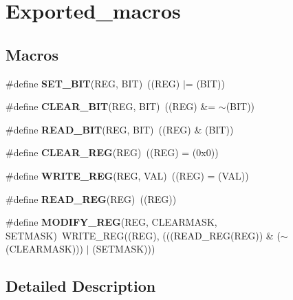 \hypertarget{group___exported__macros}{}\section{Exported\+\_\+macros}
\label{group___exported__macros}
\subsection*{Macros}
\begin{DoxyCompactItemize}
\item 
\mbox{\label{group___exported__macros_ga26474f43799fbade9cf300e21dd3a91a}} 
\#define {\bfseries S\+E\+T\+\_\+\+B\+IT}(R\+EG,  B\+IT)~((R\+EG) $\vert$= (B\+IT))
\item 
\mbox{\label{group___exported__macros_ga133aae6fc0d41bffab39ab223a7001de}} 
\#define {\bfseries C\+L\+E\+A\+R\+\_\+\+B\+IT}(R\+EG,  B\+IT)~((R\+EG) \&= $\sim$(B\+IT))
\item 
\mbox{\label{group___exported__macros_ga822bb1bb9710d5f2fa6396b84e583c33}} 
\#define {\bfseries R\+E\+A\+D\+\_\+\+B\+IT}(R\+EG,  B\+IT)~((R\+EG) \& (B\+IT))
\item 
\mbox{\label{group___exported__macros_ga1378fbdda39f40b85420df55f41460ef}} 
\#define {\bfseries C\+L\+E\+A\+R\+\_\+\+R\+EG}(R\+EG)~((R\+EG) = (0x0))
\item 
\mbox{\label{group___exported__macros_ga32f78bffcaf6d13023dcd7f05e0c4d57}} 
\#define {\bfseries W\+R\+I\+T\+E\+\_\+\+R\+EG}(R\+EG,  V\+AL)~((R\+EG) = (V\+AL))
\item 
\mbox{\label{group___exported__macros_gae7f188a4d26c9e713a48414783421071}} 
\#define {\bfseries R\+E\+A\+D\+\_\+\+R\+EG}(R\+EG)~((R\+EG))
\item 
\mbox{\label{group___exported__macros_ga6553c99f510c3bab8cc0a91602053247}} 
\#define {\bfseries M\+O\+D\+I\+F\+Y\+\_\+\+R\+EG}(R\+EG,  C\+L\+E\+A\+R\+M\+A\+SK,  S\+E\+T\+M\+A\+SK)~W\+R\+I\+T\+E\+\_\+\+R\+EG((R\+EG), (((R\+E\+A\+D\+\_\+\+R\+EG(R\+EG)) \& ($\sim$(C\+L\+E\+A\+R\+M\+A\+SK))) $\vert$ (S\+E\+T\+M\+A\+SK)))
\end{DoxyCompactItemize}


\subsection{Detailed Description}
